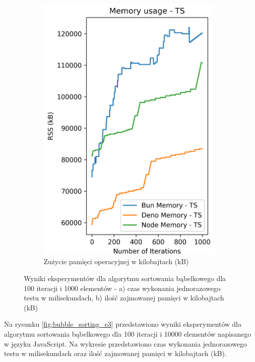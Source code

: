 \begin{figure}[H]
\begin{subfigure}[b]{0.4\textwidth}
    \includegraphics[width=\textwidth]{Figures/sorting/sorting_bubble_1000_1000_ts_memory.png}
    \caption{Zużycie pamięci operacyjnej w kilobajtach (kB)}
    \label{fig:bubble_sorting_e2_ts_memory}
  \end{subfigure}
  \caption{Wyniki eksperymentów dla algorytmu sortowania bąbelkowego dla 100 iteracji i 1000 elementów - a) czas wykonania jednorazowego testu w milisekundach, b) ilość zajmowanej pamięci w kilobajtach (kB)}
  \label{fig:bubble_sorting_e2_ts}
\end{figure}

Na rysunku \ref{fig:bubble_sorting_e3} przedstawiono wyniki eksperymentów dla algorytmu sortowania bąbelkowego dla 100 iteracji i 10000 elementów napisanego w języku JavaScript. Na wykresie przedstawiono czas wykonania jednorazowego testu w milisekundach oraz ilość zajmowanej pamięci w kilobajtach (kB).

